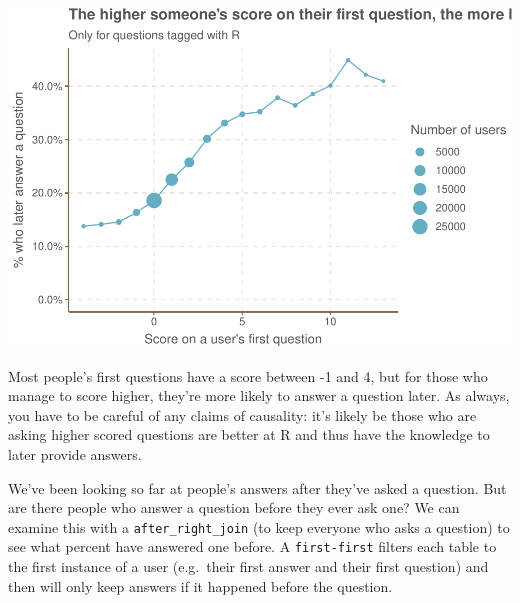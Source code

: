 \documentclass[]{article}
\newenvironment{Shaded}{\begin{snugshade}}{\end{snugshade}}
\newcommand{\KeywordTok}[1]{\textcolor[rgb]{0.13,0.29,0.53}{\textbf{#1}}}
\newcommand{\DataTypeTok}[1]{\textcolor[rgb]{0.13,0.29,0.53}{#1}}
\newcommand{\StringTok}[1]{\textcolor[rgb]{0.31,0.60,0.02}{#1}}
\newcommand{\OperatorTok}[1]{\textcolor[rgb]{0.81,0.36,0.00}{\textbf{#1}}}
\newcommand{\NormalTok}[1]{#1}
\begin{document}
\includegraphics{2019-07-25-introducing-the-funneljoin-package_files/figure-latex/unnamed-chunk-13-1.pdf}

Most people's first questions have a score between -1 and 4, but for
those who manage to score higher, they're more likely to answer a
question later. As always, you have to be careful of any claims of
causality: it's likely be those who are asking higher scored questions
are better at R and thus have the knowledge to later provide answers.

We've been looking so far at people's answers after they've asked a
question. But are there people who answer a question before they ever
ask one? We can examine this with a \texttt{after\_right\_join} (to keep
everyone who asks a question) to see what percent have answered one
before. A \texttt{first-first} filters each table to the first instance
of a user (e.g.~their first answer and their first question) and then
will only keep answers if it happened before the question.

\begin{Shaded}
\end{Shaded}
\end{document}
